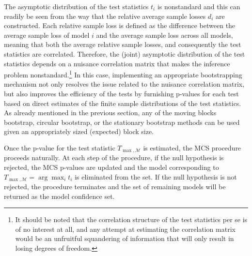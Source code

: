 \documentclass{article} %
\begin{document}
	The asymptotic distribution of the test statistics $t_i$ is nonstandard and this can readily be seen from the way that the relative average sample losses $d_i$ are constructed. Each relative sample loss is defined as the difference between the average sample loss of model $i$ and the average sample loss across all models, meaning that both the average relative sample losses, and consequently the test statistics are correlated. Therefore, the (joint) asymptotic distribution of the test statistics depends on a nuisance correlation matrix that makes the inference problem nonstandard.\footnote{It should be noted that the correlation structure of the test statistics per se is of no interest at all, and any attempt at estimating the correlation matrix would be an unfruitful squandering of information that will only result in losing degrees of freedom.} In this case, implementing an appropriate bootstrapping mechanism not only resolves the issue related to the nuisance correlation matrix, but also improves the efficiency of the tests by furnishing p-values for each test based on direct estimates of the finite sample distributions of the test statistics. As already mentioned in the previous section, any of the moving blocks bootstrap, circular bootstrap, or the stationary bootstrap methods can be used given an appropriately sized (expected) block size.
	
	Once the p-value for the test statistic $T_{\max, \mathcal{M}}$ is estimated, the MCS procedure proceeds naturally. At each step of the procedure, if the null hypothesis is rejected, the MCS p-values are updated and the model corresponding to $T_{\max, \mathcal{M}} = \arg \max_i t_i$ is eliminated from the set. If the null hypothesis is not rejected, the procedure terminates and the set of remaining models will be returned as the model confidence set. 
	
\end{document}
